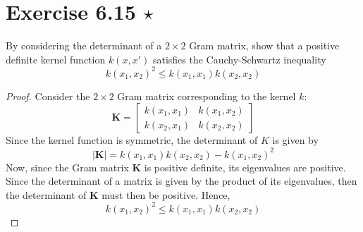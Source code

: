 \section*{Exercise 6.15 $\star$}
By considering the determinant of a $2 \times 2$ Gram matrix,
show that a positive definite kernel function $k(x, x')$ satisfies
the Cauchy-Schwartz inequality
\begin{equation*}
    k(x_1, x_2)^2 \leq k(x_1, x_1)k(x_2, x_2)
    \tag{6.96}\label{eq:6.96}
\end{equation*}

\vspace{1em}

\begin{proof}
    Consider the $2 \times 2$ Gram matrix corresponding to the kernel $k$:
    \[
        \mathbf{K} = 
        \begin{bmatrix}
            k(x_1, x_1) & k(x_1, x_2) \\
            k(x_2, x_1) & k(x_2, x_2)
        \end{bmatrix}
    \] 
    Since the kernel function is symmetric, the determinant of $K$ is given by
    \[
        |\mathbf{K}| = k(x_1, x_1) k(x_2, x_2) - k(x_1, x_2)^2
    \] 
    Now, since the Gram matrix $\mathbf{K}$ is positive definite, its eigenvalues
    are positive. Since the determinant of a matrix is given by the product
    of its eigenvalues, then the determinant of $\mathbf{K}$ must then be positive.
    Hence,
    \begin{equation*}
        k(x_1, x_2)^2 \leq k(x_1, x_1)k(x_2, x_2)
        \tag{6.96}
    \end{equation*}
\end{proof}
